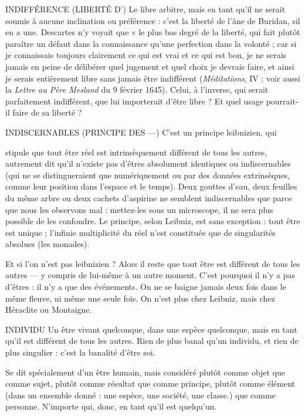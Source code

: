 INDIFFÉRENCE (LIBERTÉ D’) Le libre arbitre, mais en tant qu’il ne
serait soumis à aucune inclination ou
préférence : c’est la liberté de l’âne de Buridan, sil en a une. Descartes n’y
voyait que « le plus bas degré de la liberté, qui fait plutôt paraître un défaut
dans la connaissance qu’une perfection dans la volonté ; car si je connaissais
toujours clairement ce qui est vrai et ce qui est bon, je ne serais jamais en peine
de délibérer quel jugement et quel choix je devrais faire, et ainsi je serais entièrement
libre sans jamais être indifférent ({\it Méditations}, IV ; voir aussi la {\it Lettre au
Père Mesland} du 9 février 1645). Celui, à l'inverse, qui serait parfaitement
indifférent, que lui importerait d’être libre ? Et quel usage pourrait-il faire de sa
liberté ?

INDISCERNABLES (PRINCIPE DES —) C’est un principe leibnizien, qui

stipule que tout être réel est
intrinsèquement différent de tous les autres, autrement dit qu’il n’existe pas
d’êtres absolument identiques ou indiscernables (qui ne se distingueraient que
numériquement ou par des données extrinsèques, comme leur position dans
l’espace et le temps). Deux gouttes d’eau, deux feuilles du même arbre ou deux
cachets d’aspirine ne semblent indiscernables que parce que nous les observons
mal : mettez-les sous un microscope, il ne sera plus possible de les confondre.
Le principe, selon Leibniz, est sans exception : tout être est unique ; l’infinie
multiplicité du réel n’est constituée que de singularités absolues (les monades).

Et si l’on n’est pas leibnizien ? Alors il reste que tout être est différent de
tous les autres — y compris de lui-même à un autre moment. C’est pourquoi il
n’y a pas d'êtres : il n’y a que des événements. On ne se baigne jamais deux fois
dans le même fleuve, ni même une seule fois. On n’est plus chez Leibniz, mais
chez Héraclite ou Montaigne.

INDIVIDU Un être vivant quelconque, dans une espèce quelconque, mais
en tant qu'il est différent de tous les autres. Rien de plus banal
qu’un individu, et rien de plus singulier : c’est la banalité d’être soi.

Se dit spécialement d’un être humain, mais considéré plutôt comme objet
que comme sujet, plutôt comme résultat que comme principe, plutôt comme
élément (dans un ensemble donné : une espèce, une société, une classe.) que
comme personne. N'importe qui, donc, en tant qu’il est quelqu'un.

